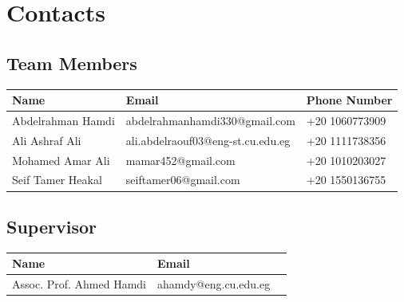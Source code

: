 \chapter*{Contacts}

\section*{Team Members}

\begin{tabular}{|l|l|l|}
\hline
\textbf{Name} & \textbf{Email} & \textbf{Phone Number} \\ \hline
Abdelrahman Hamdi   & abdelrahmanhamdi330@gmail.com & +20 1060773909 \\ \hline
Ali Ashraf Ali      & ali.abdelraouf03@eng-st.cu.edu.eg
 & +20 1111738356 \\ \hline
Mohamed Amar Ali    & mamar452@gmail.com & +20 1010203027 \\ \hline
Seif Tamer Heakal   & seiftamer06@gmail.com & +20 1550136755 \\ \hline
\end{tabular}

\vspace{2cm}

\section*{Supervisor}

\begin{tabular}{|l|l|l|}
\hline
\textbf{Name} & \textbf{Email}  \\ \hline
Assoc. Prof. Ahmed Hamdi & ahamdy@eng.cu.edu.eg \\ \hline
\end{tabular}